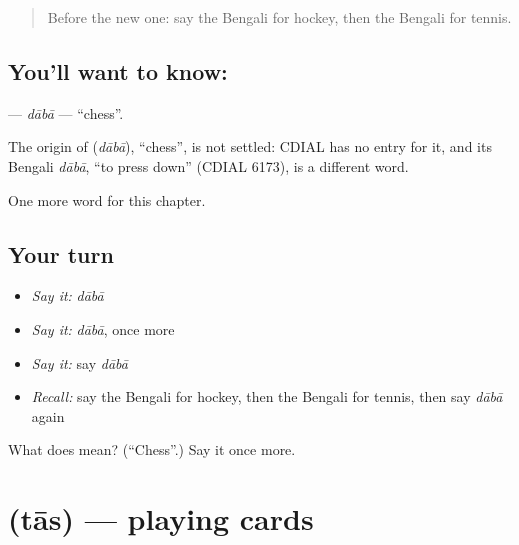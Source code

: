 \label{lesson:BN-C197-daba}



\begin{quote}
Before the new one: say the Bengali for hockey, then the Bengali for tennis.
\end{quote}

\subsection*{You'll want to know: }
\textbf{} — \emph{dābā} — \textquotedblleft{}chess\textquotedblright{}.

\begin{cousinweb}
The origin of \textbf{} (\emph{dābā}), \textquotedblleft{}chess\textquotedblright{}, is not settled: CDIAL has no entry for it, and its Bengali \emph{dābā}, \textquotedblleft{}to press down\textquotedblright{} (CDIAL 6173), is a different word.
\end{cousinweb}

\begin{grammarlens}[title={What you've built}]
One more word for this chapter.
\end{grammarlens}

\subsection*{Your turn}
\begin{itemize}
\raggedright
  \item \emph{Say it:} \emph{dābā}
  \item \emph{Say it:} \emph{dābā}, once more
  \item \emph{Say it:} say \emph{dābā}
  \item \emph{Recall:} say the Bengali for hockey, then the Bengali for tennis, then say \emph{dābā} again
\end{itemize}

\begin{tcolorbox}[breakable,colback=teal!4,colframe=teal!35!black,title={Before you move on}]
What does  mean? (\textquotedblleft{}Chess\textquotedblright{}.) Say it once more.
\end{tcolorbox}
\section[\texorpdfstring{\bn{তাস} (tās)}{তাস (tās)}]{ (tās) — playing cards}

\label{lesson:BN-C197-tas}



